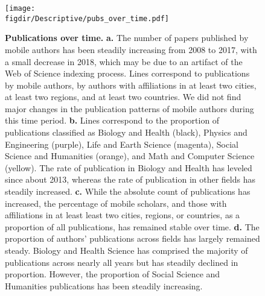 \documentclass[12pt]{article} %
\def\figdir{../Figs}
\begin{document}
%
%
%
%
%
%
%
%
\newpage

%
%
\begin{figure}[p!]
	\centering
	\texttt{[image: \\figdir/Descriptive/pubs\_over\_time.pdf]}
	\caption{
		\textbf{Publications over time.}
		\textbf{a.}
		The number of papers published by mobile authors has been steadily increasing from 2008 to 2017, with a small decrease in 2018,  which may be due to an artifact of the Web of Science indexing process.
		Lines correspond to publications by mobile authors, by authors with affiliations in at least two cities, at least two regions, and at least two countries.
		We did not find major changes in the publication patterns of mobile authors during this time period.
		\textbf{b.}
		Lines correspond to the proportion of publications classified as Biology and Health (black), Physics and Engineering (purple), Life and Earth Science (magenta), Social Science and Humanities (orange), and Math and Computer Science (yellow).
		The rate of publication in Biology and Health has leveled since about 2013, whereas the rate of publication in other fields has steadily increased.
		\textbf{c.}
		While the absolute count of publications has increased, the percentage of mobile scholars, and those with affiliations in at least least two cities, regions, or countries, as a proportion of all publications, has remained stable over time. 
		\textbf{d.}
		The proportion of authors' publications across fields has largely remained steady.
		Biology and Health Science has comprised the majority of publications across nearly all years but has steadily declined in proportion.
		However, the proportion of Social Science and Humanities publications has been steadily increasing.
	}
	\label{fig:supp:pubs_over_time}
\end{figure}
\end{document}
